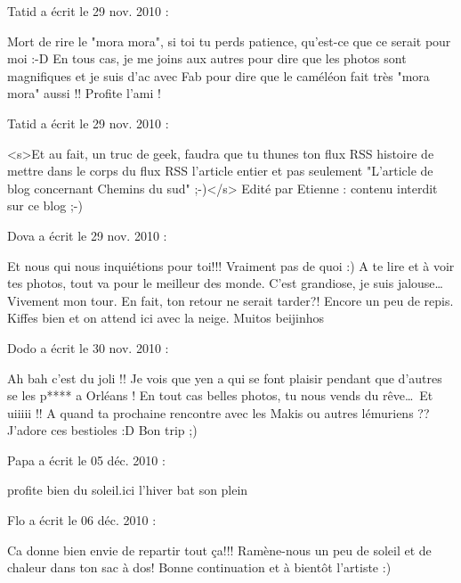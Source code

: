 \medskip
Tatid a écrit le 29 nov. 2010 :
\begin{displayquote}
Mort de rire le "mora mora", si toi tu perds patience, qu'est-ce que ce serait pour moi :-D
En tous cas, je me joins aux autres pour dire que les photos sont magnifiques et je suis d'ac avec Fab pour dire que le caméléon fait très "mora mora" aussi !!
Profite l'ami !
\end{displayquote}

\medskip
Tatid a écrit le 29 nov. 2010 :
\begin{displayquote}
<s>Et au fait, un truc de geek, faudra que tu thunes ton flux RSS histoire de mettre dans le corps du flux RSS l'article entier et pas seulement "L'article de blog concernant Chemins du sud" ;-)</s>
Edité par Etienne : contenu interdit sur ce blog ;-)
\end{displayquote}

\medskip
Dova a écrit le 29 nov. 2010 :
\begin{displayquote}
Et nous qui nous inquiétions pour toi!!!
Vraiment pas de quoi :)
A te lire et à voir tes photos, tout va pour le meilleur des monde.
C'est grandiose, je suis jalouse\dots Vivement mon tour.
En fait, ton retour ne serait tarder?! Encore un peu de repis. Kiffes bien et on attend ici avec la neige.
Muitos beijinhos
\end{displayquote}

\medskip
Dodo a écrit le 30 nov. 2010 :
\begin{displayquote}
Ah bah c'est du joli !! Je vois que yen a qui se font plaisir pendant que d'autres se les p**** a Orléans !
En tout cas belles photos, tu nous vends du rêve\dots Et uiiiii !! A quand ta prochaine rencontre avec les Makis ou autres lémuriens ?? J'adore ces bestioles :D
Bon trip ;)
\end{displayquote}

\medskip
Papa a écrit le 05 déc. 2010 :
\begin{displayquote}
profite bien du soleil.ici l'hiver bat son plein
\end{displayquote}

\medskip
Flo a écrit le 06 déc. 2010 :
\begin{displayquote}
Ca donne bien envie de repartir tout ça!!!
Ramène-nous un peu de soleil et de chaleur dans ton sac à dos!
Bonne continuation et à bientôt l'artiste :)
\end{displayquote}

\vfill
